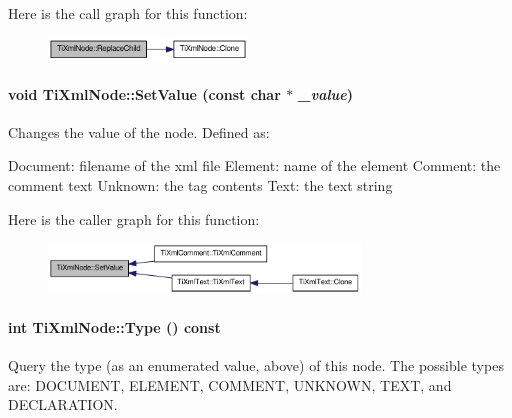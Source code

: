 Here is the call graph for this function:\nopagebreak
\begin{figure}[H]
\begin{center}
\leavevmode
\includegraphics[width=150pt]{class_ti_xml_node_a543208c2c801c84a213529541e904b9f_cgraph}
\end{center}
\end{figure}
\hypertarget{class_ti_xml_node_a2a38329ca5d3f28f98ce932b8299ae90}{
\paragraph[{SetValue}]{\setlength{\rightskip}{0pt plus 5cm}void TiXmlNode::SetValue (const char $\ast$ {\em \_\-value})}\hfill}
\label{class_ti_xml_node_a2a38329ca5d3f28f98ce932b8299ae90}
Changes the value of the node. Defined as: \begin{DoxyVerb}
		Document:	filename of the xml file
		Element:	name of the element
		Comment:	the comment text
		Unknown:	the tag contents
		Text:		the text string
		\end{DoxyVerb}
 

Here is the caller graph for this function:\nopagebreak
\begin{figure}[H]
\begin{center}
\leavevmode
\includegraphics[width=235pt]{class_ti_xml_node_a2a38329ca5d3f28f98ce932b8299ae90_icgraph}
\end{center}
\end{figure}
\hypertarget{class_ti_xml_node_a57b99d5c97d67a42b9752f5210a1ba5e}{
\paragraph[{Type}]{\setlength{\rightskip}{0pt plus 5cm}int TiXmlNode::Type () const}\hfill}
\label{class_ti_xml_node_a57b99d5c97d67a42b9752f5210a1ba5e}
Query the type (as an enumerated value, above) of this node. The possible types are: DOCUMENT, ELEMENT, COMMENT, UNKNOWN, TEXT, and DECLARATION. 

